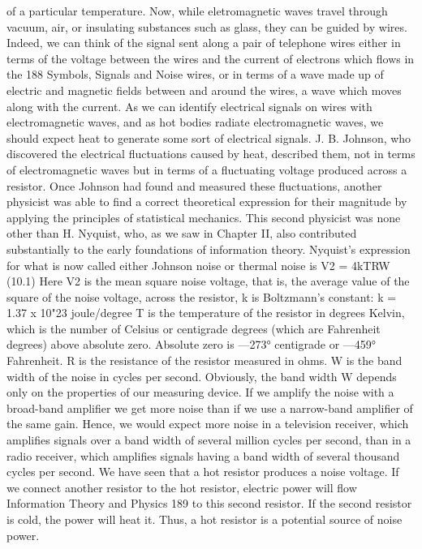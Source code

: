 {{{{{{{{{{{of a particular temperature. Now, while eletromagnetic waves
travel through vacuum, air, or insulating substances such as glass,
they can be guided by wires. Indeed, we can think of the signal
sent along a pair of telephone wires either in terms of the voltage
between the wires and the current of electrons which flows in the
188
Symbols, Signals and Noise
wires, or in terms of a wave made up of electric and magnetic fields
between and around the wires, a wave which moves along with the
current. As we can identify electrical signals on wires with electromagnetic
waves, and as hot bodies radiate electromagnetic waves,
we should expect heat to generate some sort of electrical signals.
J. B. Johnson, who discovered the electrical fluctuations caused
by heat, described them, not in terms of electromagnetic waves but
in terms of a fluctuating voltage produced across a resistor.
Once Johnson had found and measured these fluctuations,
another physicist was able to find a correct theoretical expression
for their magnitude by applying the principles of statistical mechanics.
This second physicist was none other than H. Nyquist,
who, as we saw in Chapter II, also contributed substantially to the
early foundations of information theory.
Nyquist’s expression for what is now called either Johnson noise
or thermal noise is
V2 = 4kTRW (10.1)
Here V2 is the mean square noise voltage, that is, the average
value of the square of the noise voltage, across the resistor, k is
Boltzmann’s constant:
k = 1.37 x 10"23 joule/degree
T is the temperature of the resistor in degrees Kelvin, which is the
number of Celsius or centigrade degrees (which are %
Fahrenheit degrees) above absolute zero. Absolute zero is —273°
centigrade or —459° Fahrenheit. R is the resistance of the resistor
measured in ohms. W is the band width of the noise in cycles
per second.
Obviously, the band width W depends only on the properties of
our measuring device. If we amplify the noise with a broad-band
amplifier we get more noise than if we use a narrow-band amplifier
of the same gain. Hence, we would expect more noise in a television
receiver, which amplifies signals over a band width of several
million cycles per second, than in a radio receiver, which amplifies
signals having a band width of several thousand cycles per second.
We have seen that a hot resistor produces a noise voltage. If we
connect another resistor to the hot resistor, electric power will flow
Information Theory and Physics
189
to this second resistor. If the second resistor is cold, the power will
heat it. Thus, a hot resistor is a potential source of noise power.
}}}}}}}}}}}
